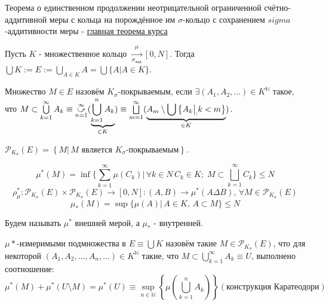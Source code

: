\documentclass[a4paper, 12pt]{article}
\begin{document}
    

\begin{remark}
    Теорема о единственном продолжении неотрицательной ограниченной счётно-аддитивной меры с кольца на порождённое им $\sigma$-кольцо с сохранением $sigma$-аддитивности меры - \underline{главная теорема курса}
\end{remark}

\begin{designation}
Пусть $K$ - множественное кольцо $\xrightarrow[\sigma_{\text{адд}}]{\mu} [0, N]$. Тогда $\bigcup K := E := \bigcup \limits_{A \in K} A = \bigcup \{A | A \in K\} $.
\end{designation}

\begin{definition}
    Множество $M \in E$ назовём $K_{\sigma}$-покрываемым, если $\exists (A_1, A_2, \dots) \in K^{\mathbb{N}}$ такое, 
    что $M \subset \bigcup \limits_{k = 1}^{\infty} A_k \equiv \cuparr{n = 1}{\infty} ( \underbrace{\bigcup \limits_{k = 1}^{n} A_k}_{\in K} ) \equiv \bigsqcup \limits_{m = 1}^{\infty} ( \underbrace{A_m \setminus  \bigcup \left\{ A_k \big|_: k < m \right\}}_{\in K} ) $.
\end{definition}

\begin{designation}
    $\mathcal{P}_{K_{\sigma}}(E) = \left\{M |\, M \text{ является } K_{\sigma}\text{-покрываемым}\right\}$.
\end{designation}

$$\mu^*(M) = \inf \{\sum \limits_{k = 1}^{\infty} \mu(C_k) |\, \forall k \in N\, C_k \in K;\; M \subset \bigsqcup \limits_{k = 1}^{\infty} C_k \} \leqslant N$$
$$\rho^*_{\mu}: \mathcal{P}_{K_{\sigma}}(E) \times \mathcal{P}_{K_{\sigma}}(E) \rightarrow [0, N]: (A, B) \rightarrow \mu^*(A \Delta B), \, \forall M \in \mathcal{P}_{K_{\sigma}}(E)$$ 
$$\mu_*(M) = \sup \{ \mu(A) |\, A \in K, \, A \subset M  \} \leqslant N$$


Будем называть $\mu^*$ внешней мерой, а $\mu_*$ - внутренней.

\begin{definition}
    $\mu*$-измеримыми подмножества в $E \equiv \bigcup K$ назовём такие $M \in \mathcal{P}_{K_{\sigma}}(E)$, что для некоторой $(A_1, A_2, \dots, A_n, \dots) \in K^{\mathbb{N}}$ такие, что $M \subset \bigcup \limits_{k = 1}^{\infty} A_k \equiv U$, выполнено соотношение:
    $$ \mu^* (M) + \mu^*(U \setminus M) = \mu^*(U) \equiv \sup \limits_{n \in \mathbb{N}}\left\{ \mu \left( \bigcup \limits_{k = 1}^{n} A_k \right)\right\} (\text{конструкция Каратеодори})$$
\end{definition}
\end{document}
